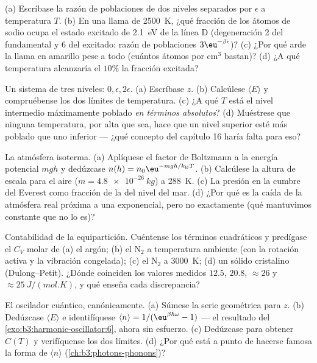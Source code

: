 \begin{exercise}[$\star$]\label{exo:b3:canonical-ensemble:1}
(a) Escríbase la razón de poblaciones de dos niveles separados por $\epsilon$
a temperatura $T$. (b) En una llama de \qty{2500}{K}, ¿qué fracción de los
átomos de sodio ocupa el estado excitado de \qty{2.1}{eV} de la línea D
(degeneración 2 del fundamental y 6 del excitado: razón de poblaciones
$3\eu^{-\beta\epsilon}$)?
(c) ¿Por qué arde la llama en amarillo pese a todo (cuántos átomos por
cm$^3$ bastan)? (d) ¿A qué temperatura alcanzaría el $10\%$ la fracción
excitada?
\end{exercise}

\begin{exercise}[$\star$]\label{exo:b3:canonical-ensemble:2}
Un sistema de tres niveles: $0, \epsilon, 2\epsilon$. (a) Escríbase $z$. (b)
Calcúlese $\langle E\rangle$ y compruébense los dos límites de temperatura. (c)
¿A qué $T$ está el nivel intermedio máximamente poblado \emph{en términos
absolutos}? (d) Muéstrese que ninguna temperatura, por alta que sea, hace
que un nivel superior esté más poblado que uno inferior --- ¿qué concepto
del capítulo 16 haría falta para eso?
\end{exercise}

\begin{exercise}[$\star$]\label{exo:b3:canonical-ensemble:3}
La atmósfera isoterma. (a) Aplíquese el factor de Boltzmann a la
energía potencial $mgh$ y dedúzcase $n(h) = n_0\eu^{-mgh/k_{\text{B}}
T}$. (b) Calcúlese la altura de escala para el aire ($m = \qty{4.8e-26}{kg}$)
a \qty{288}{K}. (c) La presión en la cumbre del Everest como fracción de la
del nivel del mar. (d) ¿Por qué es la caída de la atmósfera real próxima a
una exponencial, pero no exactamente (qué mantuvimos constante que no lo es)?
\end{exercise}

\begin{exercise}[$\star$]\label{exo:b3:canonical-ensemble:4}
Contabilidad de la equipartición. Cuéntense los términos cuadráticos y predígase
el $C_V$ molar de (a) el argón; (b) el N$_2$ a temperatura ambiente
(con la rotación activa y la vibración congelada); (c) el N$_2$ a
\qty{3000}{K}; (d) un sólido cristalino (Dulong--Petit). ¿Dónde coinciden
los valores medidos $12.5$, $20.8$, $\approx26$ y
$\approx\qty{25}{J/(mol.K)}$, y qué enseña cada discrepancia?
\end{exercise}

\begin{exercise}[$\star\star$]\label{exo:b3:canonical-ensemble:5}
El oscilador cuántico, canónicamente. (a) Súmese la serie geométrica
para $z$. (b) Dedúzcase $\langle E\rangle$ e identifíquese $\langle
n\rangle = 1/(\eu^{\beta\hbar\omega} - 1)$ --- el resultado del
\cref{exo:b3:harmonic-oscillator:6}, ahora sin esfuerzo. (c)
Dedúzcase para obtener $C(T)$ y verifíquense los dos límites. (d) ¿Por qué está a
punto de hacerse famosa la forma de $\langle n\rangle$
(\cref{ch:b3:photons-phonons})?
\end{exercise}

